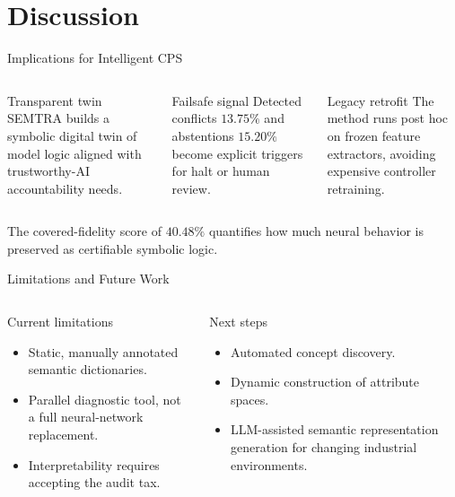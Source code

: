 \documentclass[aspectratio=169,xcolor=dvipsnames]{beamer}
\newcommand{\semtra}{SEMTRA}
\newcommand{\compactitem}{\setlength{\itemsep}{0.35em}}
\begin{document}
\section{Discussion}

\begin{frame}{Implications for Intelligent CPS}
\small
\begin{columns}[T,onlytextwidth]
\begin{block}{Transparent twin}
\small
\semtra{} builds a symbolic digital twin of model logic aligned with trustworthy-AI accountability needs.
\end{block}
\begin{block}{Failsafe signal}
\small
Detected conflicts \(13.75\%\) and abstentions \(15.20\%\) become explicit triggers for halt or human review.
\end{block}
\begin{block}{Legacy retrofit}
\small
The method runs post hoc on frozen feature extractors, avoiding expensive controller retraining.
\end{block}
\end{columns}
\vspace{0.35em}
{\scriptsize The covered-fidelity score of \(40.48\%\) quantifies how much neural behavior is preserved as certifiable symbolic logic.\par}
\end{frame}

\begin{frame}{Limitations and Future Work}
\small
\begin{columns}[T,onlytextwidth]
\begin{alertblock}{Current limitations}
\small
\begin{itemize}\compactitem
  \item Static, manually annotated semantic dictionaries.
  \item Parallel diagnostic tool, not a full neural-network replacement.
  \item Interpretability requires accepting the audit tax.
\end{itemize}
\end{alertblock}
\begin{exampleblock}{Next steps}
\small
\begin{itemize}\compactitem
  \item Automated concept discovery.
  \item Dynamic construction of attribute spaces.
  \item LLM-assisted semantic representation generation for changing industrial environments.
\end{itemize}
\end{exampleblock}
\end{columns}
\end{frame}
\end{document}
